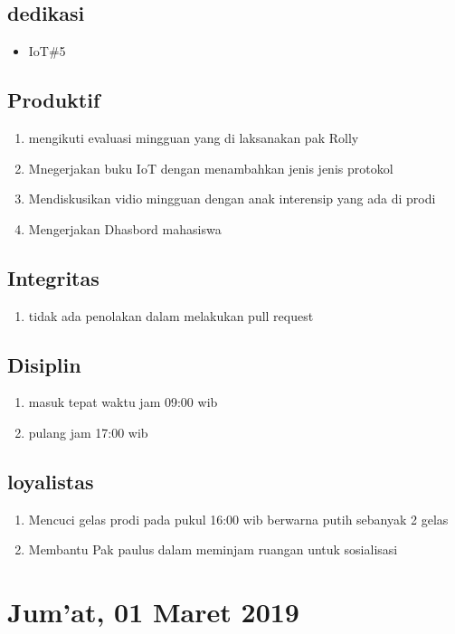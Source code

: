 \subsection{dedikasi}
\begin{itemize}
  \item IoT\#5
\end{itemize}
\subsection{Produktif}
\begin{enumerate}
  \item mengikuti evaluasi mingguan yang di laksanakan pak Rolly
  \item Mnegerjakan buku IoT dengan menambahkan jenis jenis protokol
  \item Mendiskusikan vidio mingguan dengan anak interensip yang ada di prodi
  \item Mengerjakan Dhasbord mahasiswa
\end{enumerate}
\subsection{Integritas}
\begin{enumerate}
  \item tidak ada penolakan dalam melakukan pull request
\end{enumerate}
\subsection{Disiplin}
\begin{enumerate}
  \item masuk tepat waktu jam 09:00 wib
  \item pulang jam 17:00 wib
\end{enumerate}
\subsection{loyalistas}
\begin{enumerate}
  \item Mencuci gelas prodi pada pukul 16:00 wib berwarna putih sebanyak 2 gelas
  \item Membantu Pak paulus dalam meminjam ruangan untuk sosialisasi

 

\end{enumerate} 

\section{Jum'at, 01 Maret 2019}
